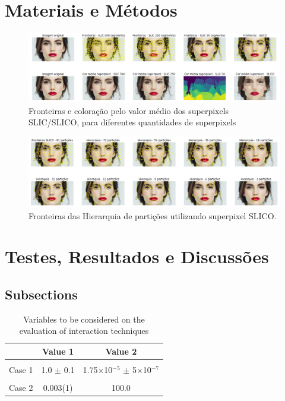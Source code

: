 \begin{document}
\section{Materiais e Métodos} \label{sec:mat_metodos}


\begin{figure}[ht]
\centering
\includegraphics[width=1.\textwidth]{slic_segmentation_compare.png}
\caption{Fronteiras e coloração pelo valor médio dos superpixels SLIC/SLICO, para diferentes quantidades de superpixels}
\label{alg:SLIC}
\end{figure}


\begin{figure}[ht]
\centering
\includegraphics[width=1.\textwidth]{slic_hierarquia_particoes.png}
\caption{Fronteiras das Hierarquia de partições utilizando superpixel SLICO.}
\label{alg:SLIC}
\end{figure}


\section{Testes, Resultados e Discussões} \label{sec:testes}


\subsection{Subsections}


\begin{table}[ht]
\centering
\caption{Variables to be considered on the evaluation of interaction
  techniques}
\label{tab:exTable1}
\smallskip
\begin{tabular}{|l|c|c|}
\hline
& Value 1 & Value 2\\[0.5ex]
\hline
&&\\[-2ex]
Case 1 & 1.0 $\pm$ 0.1 & 1.75$\times$10$^{-5}$ $\pm$ 5$\times$10$^{-7}$\\[0.5ex]
\hline
&&\\[-2ex]
Case 2 & 0.003(1) & 100.0\\[0.5ex]
\hline
\end{tabular}
\end{table}
\end{document}
